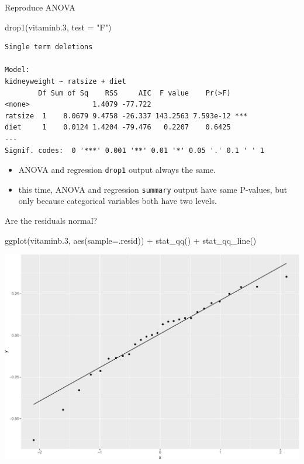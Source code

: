 \documentclass[
  ignorenonframetext,
]{beamer}
\newenvironment{Shaded}{\begin{snugshade}}{\end{snugshade}}
\newcommand{\AttributeTok}[1]{\textcolor[rgb]{0.40,0.45,0.13}{#1}}
\newcommand{\FloatTok}[1]{\textcolor[rgb]{0.68,0.00,0.00}{#1}}
\newcommand{\FunctionTok}[1]{\textcolor[rgb]{0.28,0.35,0.67}{#1}}
\newcommand{\NormalTok}[1]{\textcolor[rgb]{0.00,0.23,0.31}{#1}}
\newcommand{\SpecialCharTok}[1]{\textcolor[rgb]{0.37,0.37,0.37}{#1}}
\newcommand{\StringTok}[1]{\textcolor[rgb]{0.13,0.47,0.30}{#1}}
\providecommand{\tightlist}{%
  \setlength{\itemsep}{0pt}\setlength{\parskip}{0pt}}\usepackage{longtable,booktabs,array}
\begin{document}
\begin{frame}[fragile]{Reproduce ANOVA}
\protect\hypertarget{reproduce-anova}{}
\small

\begin{Shaded}
\begin{Highlighting}[]
  \FunctionTok{drop1}\NormalTok{(vitaminb}\FloatTok{.3}\NormalTok{, }\AttributeTok{test =} \StringTok{"F"}\NormalTok{) }
\end{Highlighting}
\end{Shaded}

\begin{verbatim}
Single term deletions

Model:
kidneyweight ~ ratsize + diet
        Df Sum of Sq    RSS     AIC  F value    Pr(>F)    
<none>               1.4079 -77.722                       
ratsize  1    8.0679 9.4758 -26.337 143.2563 7.593e-12 ***
diet     1    0.0124 1.4204 -79.476   0.2207    0.6425    
---
Signif. codes:  0 '***' 0.001 '**' 0.01 '*' 0.05 '.' 0.1 ' ' 1
\end{verbatim}

\normalsize

\begin{itemize}
\tightlist
\item
  ANOVA and regression \texttt{drop1} output always the same.
\item
  this time, ANOVA and regression \texttt{summary} output have same
  P-values, but only because categorical variables both have two levels.
\end{itemize}
\end{frame}

\begin{frame}[fragile]{Are the residuals normal?}
\protect\hypertarget{are-the-residuals-normal}{}
\begin{Shaded}
\begin{Highlighting}[]
\FunctionTok{ggplot}\NormalTok{(vitaminb}\FloatTok{.3}\NormalTok{, }\FunctionTok{aes}\NormalTok{(}\AttributeTok{sample=}\NormalTok{.resid)) }\SpecialCharTok{+} 
  \FunctionTok{stat\_qq}\NormalTok{() }\SpecialCharTok{+} \FunctionTok{stat\_qq\_line}\NormalTok{()}
\end{Highlighting}
\end{Shaded}

\includegraphics{anova_files/figure-beamer/bAnova-18-1.pdf}
\end{frame}
\end{document}
